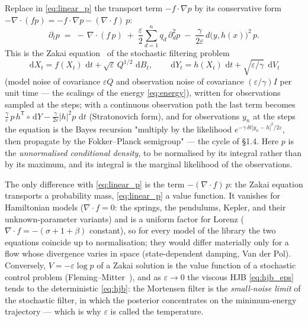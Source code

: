 \documentclass[11pt,a4paper]{article}
\newcommand{\dd}{\,\mathrm{d}}
\newcommand{\T}{^{\mathsf T}}
\newcommand{\eps}{\varepsilon}
\newcommand{\abs}[1]{\left\lvert #1 \right\rvert}
\newcommand{\grad}{\nabla}
\newcommand{\dt}{\,\delta t}
\theoremstyle{plain}
\theoremstyle{definition}
\theoremstyle{remark}
\begin{document}
Replace in \eqref{eq:linear_p} the transport term $-f\cdot\grad p$ by its conservative form $-\grad\!\cdot\!(fp) = -f\cdot\grad p - (\grad\!\cdot\! f)\,p$:
\begin{equation}
  \partial_t p \;=\; -\,\grad\!\cdot\!(f\,p) \;+\; \frac{\eps}{2}\sum_{d=1}^n q_d\,\partial_d^2 p \;-\; \frac{\gamma}{2\eps}\, d\big(y,h(x)\big)^2\, p .
  \label{eq:zakai}
\end{equation}
This is the Zakai equation~\cite{Zakai1969,BainCrisan2009} of the stochastic filtering problem
\begin{equation}
  \dd X_t = f(X_t)\,\dd t + \sqrt{\eps}\,Q^{1/2}\,\dd B_t, \qquad
  \dd Y_t = h(X_t)\,\dd t + \sqrt{\eps/\gamma}\;\dd V_t
  \label{eq:sde}
\end{equation}
(model noise of covariance $\eps Q$ and observation noise of covariance $(\eps/\gamma)I$ per unit time --- the scalings of the energy \eqref{eq:energy}), written for observations sampled at the steps; with a continuous observation path the last term becomes $\frac\gamma\eps\,p\,h\T\!\circ\dd Y - \frac{\gamma}{2\eps}\abs h^2p\,\dd t$ (Stratonovich form), and for observations $y_n$ at the steps the equation is the Bayes recursion "multiply by the likelihood $e^{-\gamma\dt\abs{y_n-h}^2/2\eps}$, then propagate by the Fokker--Planck semigroup" --- the cycle of \S1.4. Here $p$ is the \emph{unnormalised conditional density}, to be normalised by its integral rather than by its maximum, and its integral is the marginal likelihood of the observations.

The only difference with \eqref{eq:linear_p} is the term $-(\grad\cdot f)\,p$: the Zakai equation transports a probability mass, \eqref{eq:linear_p} a value function. It vanishes for Hamiltonian models ($\grad\cdot f=0$: the springs, the pendulums, Kepler, and their unknown-parameter variants) and is a uniform factor for Lorenz ($\grad\cdot f = -(\sigma+1+\beta)$ constant), so for every model of the library the two equations coincide up to normalisation; they would differ materially only for a flow whose divergence varies in space (state-dependent damping, Van der Pol). Conversely, $V=-\eps\log p$ of a Zakai solution is the value function of a stochastic control problem (Fleming--Mitter~\cite{FlemingMitter1982}), and as $\eps\to0$ the viscous HJB \eqref{eq:hjb_eps} tends to the deterministic \eqref{eq:hjb}: the Mortensen filter is the \emph{small-noise limit} of the stochastic filter, in which the posterior concentrates on the minimum-energy trajectory --- which is why $\eps$ is called the temperature.
\end{document}
